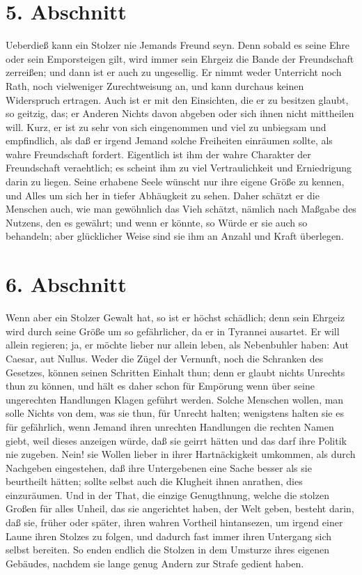\section{5. Abschnitt}

Ueberdieß kann ein Stolzer nie Jemands Freund seyn. Denn sobald es seine Ehre oder sein Emporsteigen gilt, wird immer sein Ehrgeiz die Bande der Freundschaft zerreißen; und dann ist er auch zu ungesellig. Er nimmt weder Unterricht noch Rath, noch vielweniger Zurechtweisung an, und kann durchaus keinen Widerspruch ertragen. Auch ist er mit den Einsichten, die er zu besitzen glaubt, so geitzig, das; er Anderen Nichts davon abgeben oder sich ihnen nicht mittheilen will. Kurz, er ist zu sehr von sich eingenommen und viel zu unbiegsam und empfindlich, als daß er irgend Jemand solche Freiheiten einräumen sollte, als wahre Freundschaft fordert. Eigentlich ist ihm der wahre Charakter der Freundschaft veraehtlich; es scheint ihm zu viel Vertraulichkeit und Erniedrigung darin zu liegen. Seine erhabene Seele wünscht nur ihre eigene Größe zu kennen, und Alles um sich her in tiefer Abhäugkeit zu sehen. Daher schätzt er die Menschen auch, wie man gewöhnlich das Vieh schätzt, nämlich nach Maßgabe des Nutzens, den es gewährt; und wenn er könnte, so Würde er sie auch so behandeln; aber glücklicher Weise sind sie ihm an Anzahl und Kraft überlegen.

\section{6. Abschnitt}

Wenn aber ein Stolzer Gewalt hat, so ist er höchst schädlich; denn sein Ehrgeiz wird durch seine Größe um so gefährlicher, da er in Tyrannei ausartet. Er will allein regieren; ja, er möchte lieber nur allein leben, als Nebenbuhler haben: Aut Caesar, aut Nullus. Weder die Zügel der Vernunft, noch die Schranken des Gesetzes, können seinen Schritten Einhalt thun; denn er glaubt nichts Unrechts thun zu können, und hält es daher schon für Empörung wenn über seine ungerechten Handlungen Klagen geführt werden. Solche Menschen wollen, man solle Nichts von dem, was sie thun, für Unrecht halten; wenigstens halten sie es für gefährlich, wenn Jemand ihren unrechten Handlungen die rechten Namen giebt, weil dieses anzeigen würde, daß sie geirrt hätten und das darf ihre Politik nie zugeben. Nein! sie Wollen lieber in ihrer Hartnäckigkeit umkommen, als durch Nachgeben eingestehen, daß ihre Untergebenen eine Sache besser als sie beurtheilt hätten; sollte selbst auch die Klugheit ihnen anrathen, dies einzuräumen. Und in der That, die einzige Genugthnung, welche die stolzen Großen für alles Unheil, das sie angerichtet haben, der Welt geben, besteht darin, daß sie, früher oder später, ihren wahren Vortheil hintansezen, um irgend einer Laune ihren Stolzes zu folgen, und dadurch fast immer ihren Untergang sich selbst bereiten. So enden endlich die Stolzen in dem Umsturze ihres eigenen Gebäudes, nachdem sie lange genug Andern zur Strafe gedient haben.

